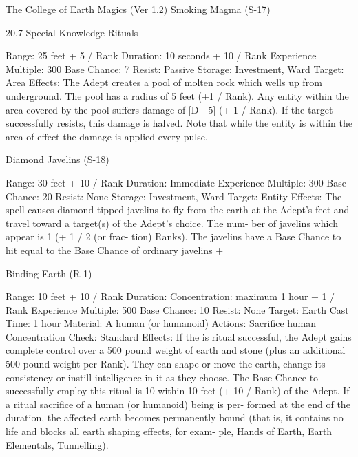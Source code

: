 \begin{Chapter}{The College of Earth Magics (Ver 1.2)}
Smoking Magma (S-17) 

20.7 Special Knowledge Rituals 

Range: 25 feet + 5 / Rank 
Duration: 10 seconds + 10 / Rank 
Experience Multiple: 300 
Base Chance: 7%
Resist: Passive 
Storage: Investment, Ward 
Target: Area 
Effects:  The  Adept  creates  a  pool  of  molten  rock 
which  wells  up  from underground.  The  pool  has a 
radius of 5 feet (+1 / Rank). Any entity within the 
area covered by the pool suffers damage of [D - 5] 
(+  1  / Rank).  If  the  target  successfully  resists, this 
damage  is  halved.  Note  that  while  the  entity  is 
within  the  area  of  effect  the  damage  is  applied 
every pulse. 

Diamond Javelins (S-18) 

Range: 30 feet + 10 / Rank 
Duration: Immediate 
Experience Multiple: 300 
Base Chance: 20%
Resist: None 
Storage: Investment, Ward 
Target: Entity 
Effects:  The  spell  causes  diamond-tipped  javelins 
to fly from the earth at the Adept’s feet and travel 
toward a target(s) of the Adept’s choice. The num-
ber of javelins which appear is 1 (+ 1 / 2 (or frac-
tion)  Ranks).  The  javelins  have  a  Base  Chance  to 
hit equal to the Base Chance of ordinary javelins + 

Binding Earth (R-1) 

Range: 10 feet + 10 / Rank 
Duration:  Concentration:  maximum  1  hour  +  1  / 
Rank 
Experience Multiple: 500 
Base Chance: 10%
Resist: None 
Target: Earth 
Cast Time: 1 hour 
Material: A human (or humanoid) 
Actions: Sacrifice human 
Concentration Check: Standard 
Effects:  If  the  is  ritual  successful,  the  Adept  gains 
complete control over a 500 pound weight of earth 
and stone (plus an additional 500 pound weight per 
Rank).  They  can  shape  or  move  the  earth,  change 
its  consistency  or  instill  intelligence  in  it  as  they 
choose.  The  Base  Chance  to  successfully  employ 
this  ritual  is  10%
within 10 feet (+ 10 / Rank) of the Adept. If a ritual 
sacrifice  of  a  human  (or  humanoid)  being  is  per-
formed at the end of the duration, the affected earth 
becomes permanently bound (that is, it contains no 
life and blocks all earth shaping effects, for exam-
ple, Hands of Earth, Earth Elementals, Tunnelling). 

\end{Chapter}

